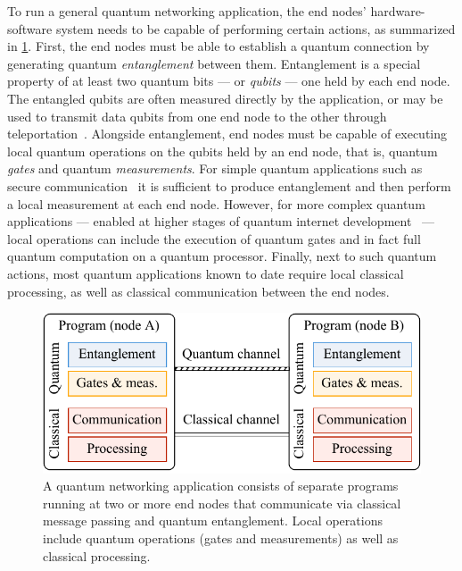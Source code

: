 To run a general quantum networking application, the end nodes' hardware-software system needs to be
capable of performing certain actions, as summarized in \cref{fig:quantum-internet}. First, the end
nodes must be able to establish a quantum connection by generating quantum \emph{entanglement}
between them. Entanglement is a special property of at least two quantum bits --- or \emph{qubits}
--- one held by each end node. The entangled qubits are often measured directly by the application,
or may be used to transmit data qubits from one end node to the other through
teleportation~\cite{bennett_1993_teleportation}. Alongside entanglement, end nodes must be capable
of executing local quantum operations on the qubits held by an end node, that is, quantum
\emph{gates} and quantum \emph{measurements}. For simple quantum applications such as secure
communication~\cite{ekert_1991_e91, bennett_2014_bb84} it is sufficient to produce entanglement and
then perform a local measurement at each end node. However, for more complex quantum applications
--- enabled at higher stages of quantum internet development~\cite{wehner_2018_stages} --- local
operations can include the execution of quantum gates and in fact full quantum computation on a
quantum processor. Finally, next to such quantum actions, most quantum applications known to date
require local classical processing, as well as classical communication between the end nodes.

\begin{figure}[H]
    \begin{center}
        \includegraphics[width=0.6\linewidth]{figures/quantum-internet.pdf}
    \end{center}
    \caption{
        A quantum networking application consists of separate programs running at two or more end
        nodes that communicate via classical message passing and quantum entanglement. Local operations
        include quantum operations (gates and measurements) as well as classical processing.
    }
    \label{fig:quantum-internet}
\end{figure}

